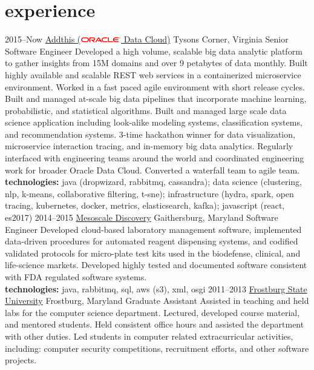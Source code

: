 \documentclass[]{friggeri-cv} %
\begin{document}
\section{experience}
\begin{entrylist}
\entry
{2015--Now}
{\href{https://www.addthis.com/}{Addthis (\includegraphics[width=50pt]{500px-Oracle_logo.svg.png}  Data Cloud)}}
{Tysons Corner, Virginia}
{Senior Software Engineer}
{
	Developed a high volume, scalable big data analytic platform to gather insights from 15M domains and over 9 petabytes of data monthly. Built highly available and scalable REST web services in a containerized microservice environment. Worked in a fast paced agile environment with short release cycles. Built and managed at-scale big data pipelines that incorporate machine learning, probabilistic, and statistical algorithms. Built and managed large scale data science application including look-alike modeling systems, classification systems, and recommendation systems. 3-time hackathon winner for data visualization, microservice interaction tracing, and in-memory big data analytics. Regularly interfaced with engineering teams around the world and coordinated engineering work for broader Oracle Data Cloud. Converted a waterfall team to agile team.\\
	\textbf{technologies:} java (dropwizard, rabbitmq, cassandra); data science (clustering, nlp, k-means, collaborative filtering, t-sne); infrastructure (hydra, spark, open tracing, kubernetes, docker, metrics, elasticsearch, kafka); javascript (react, es2017)
}
\entry
{2014--2015}
{\href{https://www.mesoscale.com/}{Mesoscale Discovery}}
{Gaithersburg, Maryland}
{Software Engineer}
{
	Developed cloud-based laboratory management software, implemented data-driven procedures for automated reagent dispensing systems, and codified validated protocols for micro-plate test kits used in the biodefense, clinical, and life-science markets. Developed highly tested and documented software consistent with FDA regulated software systems.\\
	\textbf{technologies:} java, rabbitmq, sql, aws (s3), xml, osgi
}
\entry
{2011--2013}
{\href{http://www.frostburg.edu/}{Frostburg State University}}
{Frostburg, Maryland}
{Graduate Assistant}
{
	Assisted in teaching and held labs for the computer science department. Lectured, developed course material, and mentored students. Held consistent office hours and assisted the department with other duties. Led students in computer related extracurricular activities, including: computer security competitions, recruitment efforts, and other software projects.
}
\end{entrylist}
\end{document}
